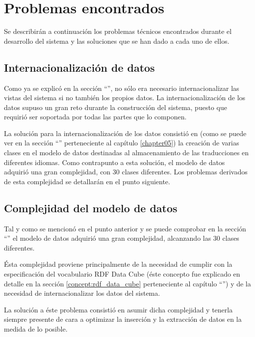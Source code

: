 \section{Problemas encontrados}
\label{implementacion:problemas_encontrados}
	
	Se describirán a continuación los problemas técnicos encontrados durante el desarrollo del sistema y las soluciones que se han dado a cada uno de ellos.
	
	\subsection{Internacionalización de datos}
	\label{implementacion:internacionalizacion_datos}
		
		Como ya se explicó en la sección ``'', no sólo era necesario internacionalizar las vistas del sistema si no también los propios datos.  La internacionalización de los datos supuso un gran reto durante la construcción del sistema, puesto que requirió ser soportada por todas las partes que lo componen.
		
		La solución para la internacionalización de los datos consistió en (como se puede ver en la sección ``'' perteneciente al capítulo \ref{chapter05}) la creación de varias clases en el modelo de datos destinadas al almacenamiento de las traducciones en diferentes idiomas.  Como contrapunto a esta solución, el modelo de datos adquirió una gran complejidad, con 30 clases diferentes.  Los problemas derivados de esta complejidad se detallarán en el punto siguiente.
	
	\subsection{Complejidad del modelo de datos}
	\label{implementacion:internacionalizacion_datos}
		
		Tal y como se mencionó en el punto anterior y se puede comprobar en la sección ``'' el modelo de datos adquirió una gran complejidad, alcanzando las 30 clases diferentes.
		
		Ésta complejidad proviene principalmente de la necesidad de cumplir con la especificación del vocabulario RDF Data Cube (éste concepto fue explicado en detalle en la sección \ref{concept:rdf_data_cube} perteneciente al capítulo ``'') y de la necesidad de internacionalizar los datos del sistema.
		
		La solución a éste problema consistió en asumir dicha complejidad y tenerla siempre presente de cara a optimizar la inserción y la extracción de datos en la medida de lo posible.
		
